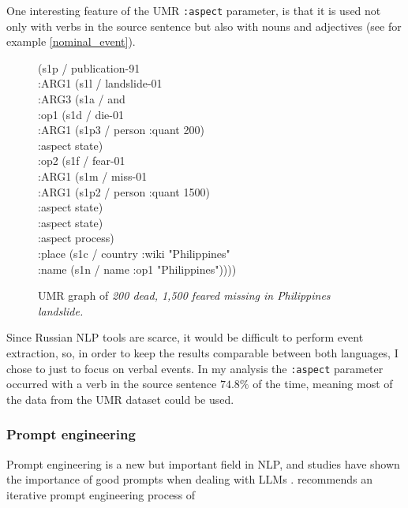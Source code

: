 One interesting feature of the UMR \texttt{:aspect} parameter, is that it is used not only with verbs in the source sentence but also with nouns and adjectives (see for example \ref{nominal_event}).

\begin{figure}[t]
    (s1p / publication-91 \\
    \null\quad :ARG1 (s1l / landslide-01 \\
    \null\quad \quad:ARG3 (s1a / and \\
    \null\quad \quad\quad:op1 (s1d / die-01 \\
    \null\quad \quad\quad\quad:ARG1 (s1p3 / person :quant 200) \\
    \null\quad \quad\quad\quad:aspect state) \\
    \null\quad \quad\quad:op2 (s1f / fear-01 \\
    \null\quad \quad\quad\quad:ARG1 (s1m / miss-01 \\
    \null\quad \quad\quad\quad\quad:ARG1 (s1p2 / person :quant 1500) \\
    \null\quad \quad\quad\quad\quad:aspect state) \\
    \null\quad \quad\quad\quad:aspect state) \\
    \null\quad \quad\quad:aspect process) \\
    \null\quad :place (s1c / country :wiki "Philippines"  \\
    \null\quad \quad:name (s1n / name :op1 "Philippines"))))
    \caption{UMR graph of \emph{200 dead, 1,500 feared missing in Philippines landslide.}}
\end{figure}
\label{nominal_event}

Since Russian NLP tools are scarce, it would be difficult to perform event extraction, so, in order to keep the results comparable between both languages, I chose to just to focus on verbal events. In my analysis the \texttt{:aspect} parameter occurred with a verb in the source sentence $74.8\%$ of the time, meaning most of the data from the UMR dataset could be used.

\subsubsection*{Prompt engineering}
Prompt engineering is a new but important field in NLP, and studies have shown the importance of good prompts when dealing with LLMs \citep{kaddour2023challenges, hsieh2023automatic, sahoo2024systematic}. \citet{törnberg2024best} recommends an iterative prompt engineering process of 

